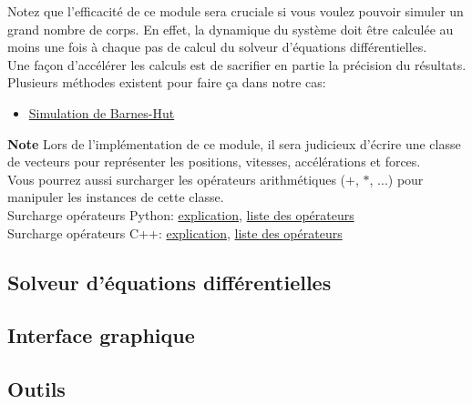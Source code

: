 \documentclass{article}
\begin{document}
Notez que l'efficacité de ce module sera cruciale si vous voulez pouvoir simuler un grand nombre de corps. En effet, la dynamique du système doit être calculée au moins une fois à chaque pas de calcul du solveur d'équations différentielles.\\
Une façon d'accélérer les calculs est de sacrifier en partie la précision du résultats. Plusieurs méthodes existent pour faire ça dans notre cas:
\begin{itemize}
    \item \href{https://en.wikipedia.org/wiki/Barnes\%E2\%80\%93Hut_simulation}{Simulation de Barnes-Hut}
\end{itemize}

\vspace{1em}

\noindent\textbf{Note} Lors de l'implémentation de ce module, il sera judicieux d'écrire une classe de vecteurs pour représenter les positions, vitesses, accélérations et forces. \\
Vous pourrez aussi surcharger les opérateurs arithmétiques ($+$, $*$, ...) pour manipuler les instances de cette classe.\\
Surcharge opérateurs Python: \href{https://openclassrooms.com/fr/courses/235344-apprenez-a-programmer-en-python/233046-appliquez-des-methodes-speciales#/id/r-232928}{explication}, \href{https://docs.python.org/fr/3/library/operator.html}{liste des opérateurs}\\
Surcharge opérateurs C++: \href{https://openclassrooms.com/fr/courses/1894236-programmez-avec-le-langage-c/1897891-surchargez-un-operateur}{explication}, \href{https://web.maths.unsw.edu.au/~lafaye/CCM/cpp/cppop.htm}{liste des opérateurs}

\subsection{Solveur d'équations différentielles}
\label{solveur}

\subsection{Interface graphique}
\label{interface}

\subsection{Outils}
\label{outils}
\end{document}

